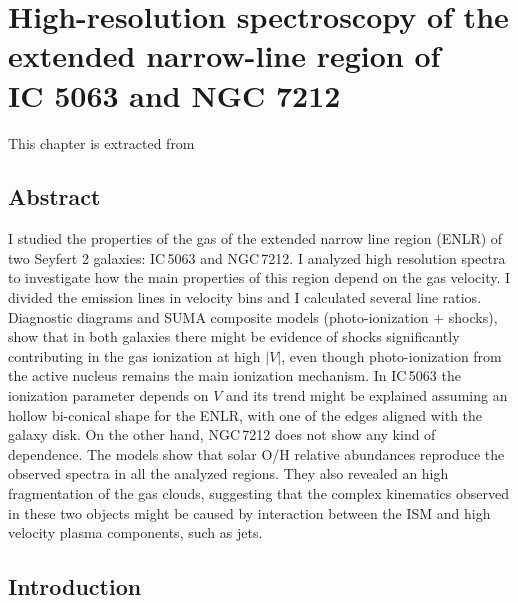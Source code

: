 \documentclass[../main.tex]{subfiles}
\begin{document}
\chapter[High-res. spectroscopy of ENLRs]{High-resolution spectroscopy of the extended narrow-line region of \\IC 5063 and NGC 7212}
\label{cap:paper1}

\epigraph{This chapter is extracted from \citet{Congiu17b}}{}

\section{Abstract}

I studied the properties of the gas of the extended narrow line region (ENLR) of two Seyfert 2 galaxies: IC\,5063 and NGC\,7212.
I analyzed high resolution spectra to investigate how the main properties of this region depend on the gas velocity.
I divided the emission lines in velocity bins and I calculated several line ratios.
Diagnostic diagrams and SUMA composite models (photo-ionization $+$ shocks), show that in both galaxies there might be evidence of shocks significantly contributing in the gas ionization at high $\lvert V \rvert$, even though photo-ionization from the active nucleus remains the main ionization mechanism.
In IC\,5063 the ionization parameter depends on $V$ and its trend might be explained assuming an hollow bi-conical shape for the ENLR, with one of the edges aligned with the galaxy disk.
On the other hand, NGC\,7212 does not show any kind of dependence.
The models show that solar O/H relative abundances reproduce the observed spectra in all the analyzed regions.
They also revealed an high fragmentation of the gas clouds, suggesting that the complex kinematics observed in these two objects might be caused by interaction between the ISM and high velocity plasma components, such as jets.

\section{Introduction}
\end{document}
